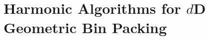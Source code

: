 \chapter{Harmonic Algorithms for \texorpdfstring{$d$}{d}D Geometric Bin Packing}
\label{chap:hdhk}










\begin{optional}

\end{optional}
